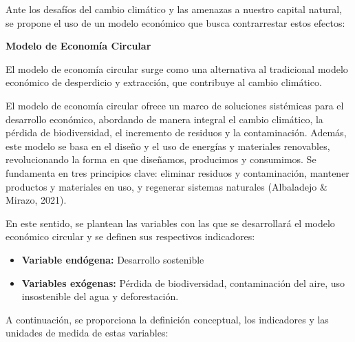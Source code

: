 \documentclass[
  stu,
  floatsintext,
  longtable,
  a4paper,
  nolmodern,
  notxfonts,
  notimes,
  12pt,
  colorlinks=true,linkcolor=blue,citecolor=blue,urlcolor=blue]{apa7}
\providecommand{\tightlist}{%
  \setlength{\itemsep}{0pt}\setlength{\parskip}{0pt}}
\begin{document}
Ante los desafíos del cambio climático y las amenazas a nuestro capital
natural, se propone el uso de un modelo económico que busca
contrarrestar estos efectos:

\textbf{Modelo de Economía Circular}

El modelo de economía circular surge como una alternativa al tradicional
modelo económico de desperdicio y extracción, que contribuye al cambio
climático.

El modelo de economía circular ofrece un marco de soluciones sistémicas
para el desarrollo económico, abordando de manera integral el cambio
climático, la pérdida de biodiversidad, el incremento de residuos y la
contaminación. Además, este modelo se basa en el diseño y el uso de
energías y materiales renovables, revolucionando la forma en que
diseñamos, producimos y consumimos. Se fundamenta en tres principios
clave: eliminar residuos y contaminación, mantener productos y
materiales en uso, y regenerar sistemas naturales (Albaladejo \& Mirazo,
2021).

En este sentido, se plantean las variables con las que se desarrollará
el modelo económico circular y se definen sus respectivos indicadores:

\begin{itemize}
\tightlist
\item
  \textbf{Variable endógena:} Desarrollo sostenible
\item
  \textbf{Variables exógenas:} Pérdida de biodiversidad, contaminación
  del aire, uso insostenible del agua y deforestación.
\end{itemize}

A continuación, se proporciona la definición conceptual, los indicadores
y las unidades de medida de estas variables:
\end{document}
